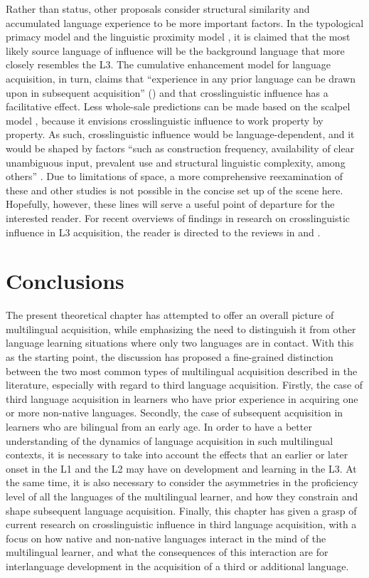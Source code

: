 \documentclass[output=paper]{../langscibook}
\begin{document}
Rather than status, other proposals consider structural similarity and accumulated language experience to be more important factors. In the typological primacy model \citep{Rothman2015} and the linguistic proximity model \citep{WestergaardEtAl2017}, it is claimed that the most likely source language of influence will be the background language that more closely resembles the L3. The cumulative enhancement model for language acquisition, in turn, claims that “experience in any prior language can be drawn upon in subsequent acquisition” (\citealt[13]{FlynnEtAl2004}) and that crosslinguistic influence has a facilitative effect. Less whole-sale predictions can be made based on the scalpel model \citep{Slabakova2017}, because it envisions crosslinguistic influence to work property by property. As such, crosslinguistic influence would be language-dependent, and it would be shaped by factors “such as construction frequency, availability of clear unambiguous input, prevalent use and structural linguistic complexity, among others” \citep[653]{Slabakova2017}. Due to limitations of space, a more comprehensive reexamination of these and other studies is not possible in the concise set up of the scene here. Hopefully, however, these lines will serve a useful point of departure for the interested reader. For recent overviews of findings in research on crosslinguistic influence in L3 acquisition, the reader is directed to the reviews in \citet{Bardel2019, DeAngelis2019} and \citet{Puig-MayencoEtAl2018}.

\section{Conclusions}\label{sec:sanchez1:5}

The present theoretical chapter has attempted to offer an overall picture of multilingual acquisition, while emphasizing the need to distinguish it from other language learning situations where only two languages are in contact. With this as the starting point, the discussion has proposed a fine-grained distinction between the two most common types of multilingual acquisition described in the literature, especially with regard to third language acquisition. Firstly, the case of third language acquisition in learners who have prior experience in acquiring one or more non-native languages. Secondly, the case of subsequent acquisition in learners who are bilingual from an early age. In order to have a better understanding of the dynamics of language acquisition in such multilingual contexts, it is necessary to take into account the effects that an earlier or later onset in the L1 and the L2 may have on development and learning in the L3. At the same time, it is also necessary to consider the asymmetries in the proficiency level of all the languages of the multilingual learner, and how they constrain and shape subsequent language acquisition. Finally, this chapter has given a grasp of current research on crosslinguistic influence in third language acquisition, with a focus on how native and non-native languages interact in the mind of the multilingual learner, and what the consequences of this interaction are for interlanguage development in the acquisition of a third or additional language.

{\sloppy\printbibliography[heading=subbibliography,notkeyword=this]}
\end{document}
